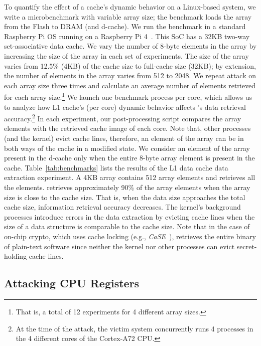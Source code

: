 To quantify the effect of a cache's dynamic behavior on a Linux-based system, we write a microbenchmark with variable array size;
the benchmark loads the array from the Flash to DRAM (and d-cache).
We run the benchmark in a standard Raspberry Pi OS running on a Raspberry Pi 4~\cite{rpi4}.
This SoC has a 32KB two-way set-associative data cache.
We vary the number of 8-byte elements in the array by increasing the size of the array in each set of experiments.
The size of the array varies from 12.5\% (4KB) of the cache size to full-cache size (32KB);
by extension, the number of elements in the array varies from 512 to 2048.  
We repeat \sys{} attack on each array size three times and calculate an average number of elements retrieved for each array size.\footnote{That is, a total of 12 experiments for 4 different array sizes.} 
We launch one benchmark process per core, which allows us to analyze how L1 cache's (per core) dynamic behavior affects \sys{}'s data retrieval accuracy.\footnote{At the time of the attack, the victim system concurrently runs 4 processes in the 4 different cores of the Cortex-A72 CPU.} 
In each experiment, our post-processing script compares the array elements with the retrieved cache image of each core. 
Note that, other processes (and the kernel) evict cache lines, therefore, an element of the array can be in both ways of the cache in a modified state. 
We consider an element of the array present in the d-cache only when the entire 8-byte array element is present in the cache.
Table~\ref{tab:benchmarks} lists the results of the L1 data cache data extraction experiment.
A 4KB array contains 512 array elements and \sys{} retrieves all the elements.
\sys{} retrieves approximately 90\% of the array elements when the array size is close to the cache size.
That is, when the data size approaches the total cache size, information retrieval accuracy decreases.
The kernel's background processes introduce errors in the data extraction by evicting cache lines when the size of a data structure is comparable to the cache size.
Note that in the case of on-chip crypto, which uses cache locking (e.g., \textit{CaSE}~\cite{zhang2016case}), \sys{} retrieves the entire binary of plain-text software since neither the kernel nor other processes can evict secret-holding cache lines.

\subsection{Attacking CPU Registers}
\label{sub_sec_cpu_registers}

